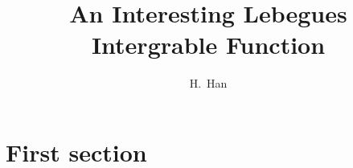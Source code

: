 \documentclass{beamer}
\title[An Interesting Lebegues Intergrable Function] %
{An Interesting Lebegues Intergrable Function}
\author[H.~Han]
{H.~Han}
\begin{document}
\frame{\titlepage}




\section{First section}

%



%
%

\end{document}
